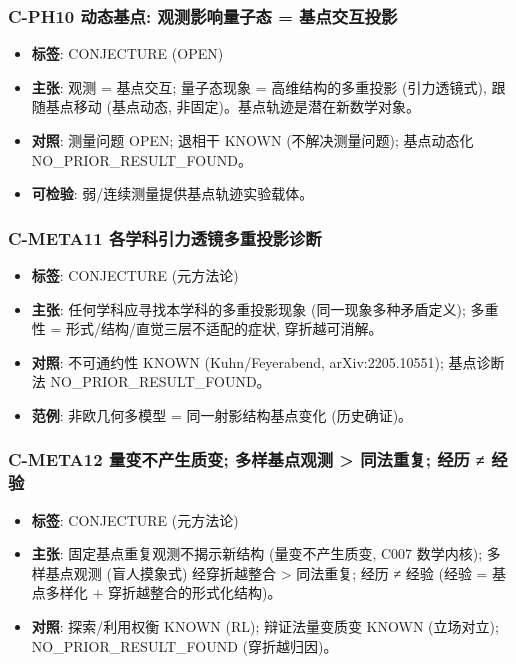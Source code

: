 \documentclass[
]{article}
\providecommand{\tightlist}{%
  \setlength{\itemsep}{0pt}\setlength{\parskip}{0pt}}
\begin{document}
\subsubsection{C-PH10 动态基点: 观测影响量子态 =
基点交互投影}\label{c-ph10-ux52a8ux6001ux57faux70b9-ux89c2ux6d4bux5f71ux54cdux91cfux5b50ux6001-ux57faux70b9ux4ea4ux4e92ux6295ux5f71}

\begin{itemize}
\tightlist
\item
  \textbf{标签}: CONJECTURE (OPEN)
\item
  \textbf{主张}: 观测 = 基点交互; 量子态现象 = 高维结构的多重投影
  (引力透镜式), 跟随基点移动 (基点动态,
  非固定)。基点轨迹是潜在新数学对象。
\item
  \textbf{对照}: 测量问题 OPEN; 退相干 KNOWN (不解决测量问题);
  基点动态化 NO\_PRIOR\_RESULT\_FOUND。
\item
  \textbf{可检验}: 弱/连续测量提供基点轨迹实验载体。
\end{itemize}

\subsubsection{C-META11
各学科引力透镜多重投影诊断}\label{c-meta11-ux5404ux5b66ux79d1ux5f15ux529bux900fux955cux591aux91cdux6295ux5f71ux8bcaux65ad}

\begin{itemize}
\tightlist
\item
  \textbf{标签}: CONJECTURE (元方法论)
\item
  \textbf{主张}: 任何学科应寻找本学科的多重投影现象
  (同一现象多种矛盾定义); 多重性 = 形式/结构/直觉三层不适配的症状,
  穿折越可消解。
\item
  \textbf{对照}: 不可通约性 KNOWN (Kuhn/Feyerabend, arXiv:2205.10551);
  基点诊断法 NO\_PRIOR\_RESULT\_FOUND。
\item
  \textbf{范例}: 非欧几何多模型 = 同一射影结构基点变化 (历史确证)。
\end{itemize}

\subsubsection{C-META12 量变不产生质变; 多样基点观测 \textgreater{}
同法重复; 经历 ≠
经验}\label{c-meta12-ux91cfux53d8ux4e0dux4ea7ux751fux8d28ux53d8-ux591aux6837ux57faux70b9ux89c2ux6d4b-ux540cux6cd5ux91cdux590d-ux7ecfux5386-ux7ecfux9a8c}

\begin{itemize}
\tightlist
\item
  \textbf{标签}: CONJECTURE (元方法论)
\item
  \textbf{主张}: 固定基点重复观测不揭示新结构 (量变不产生质变, C007
  数学内核); 多样基点观测 (盲人摸象式) 经穿折越整合 \textgreater{}
  同法重复; 经历 ≠ 经验 (经验 = 基点多样化 + 穿折越整合的形式化结构)。
\item
  \textbf{对照}: 探索/利用权衡 KNOWN (RL); 辩证法量变质变 KNOWN
  (立场对立); NO\_PRIOR\_RESULT\_FOUND (穿折越归因)。
\end{itemize}
\end{document}
